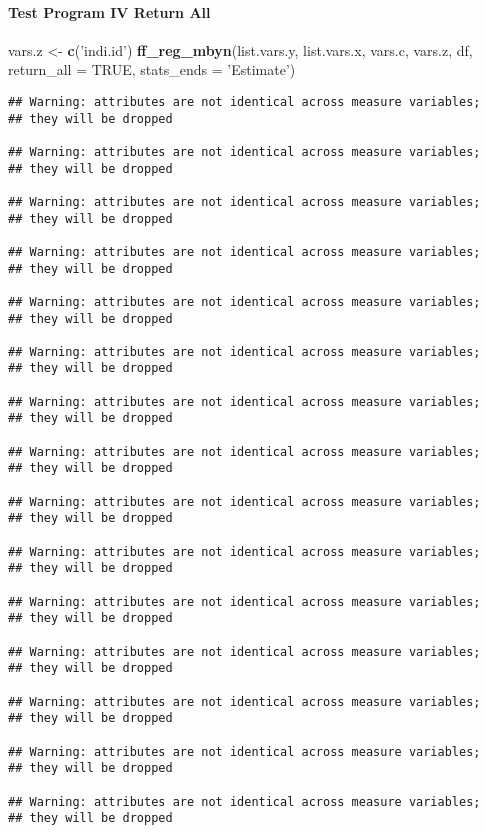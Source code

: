 \documentclass[
]{book}
\newenvironment{Shaded}{\begin{snugshade}}{\end{snugshade}}
\newcommand{\DataTypeTok}[1]{\textcolor[rgb]{0.13,0.29,0.53}{#1}}
\newcommand{\KeywordTok}[1]{\textcolor[rgb]{0.13,0.29,0.53}{\textbf{#1}}}
\newcommand{\NormalTok}[1]{#1}
\newcommand{\OtherTok}[1]{\textcolor[rgb]{0.56,0.35,0.01}{#1}}
\newcommand{\StringTok}[1]{\textcolor[rgb]{0.31,0.60,0.02}{#1}}
\begin{document}
\hypertarget{test-program-iv-return-all}{%
\paragraph{Test Program IV Return All}\label{test-program-iv-return-all}}

\begin{Shaded}
\begin{Highlighting}[]
\NormalTok{vars.z <-}\StringTok{ }\KeywordTok{c}\NormalTok{(}\StringTok{'indi.id'}\NormalTok{)}
\KeywordTok{ff_reg_mbyn}\NormalTok{(list.vars.y, list.vars.x,}
\NormalTok{            vars.c, vars.z, df,}
            \DataTypeTok{return_all =} \OtherTok{TRUE}\NormalTok{,}
            \DataTypeTok{stats_ends =} \StringTok{'Estimate'}\NormalTok{)}
\end{Highlighting}
\end{Shaded}

\begin{verbatim}
## Warning: attributes are not identical across measure variables;
## they will be dropped

## Warning: attributes are not identical across measure variables;
## they will be dropped

## Warning: attributes are not identical across measure variables;
## they will be dropped

## Warning: attributes are not identical across measure variables;
## they will be dropped

## Warning: attributes are not identical across measure variables;
## they will be dropped

## Warning: attributes are not identical across measure variables;
## they will be dropped

## Warning: attributes are not identical across measure variables;
## they will be dropped

## Warning: attributes are not identical across measure variables;
## they will be dropped

## Warning: attributes are not identical across measure variables;
## they will be dropped

## Warning: attributes are not identical across measure variables;
## they will be dropped

## Warning: attributes are not identical across measure variables;
## they will be dropped

## Warning: attributes are not identical across measure variables;
## they will be dropped

## Warning: attributes are not identical across measure variables;
## they will be dropped

## Warning: attributes are not identical across measure variables;
## they will be dropped

## Warning: attributes are not identical across measure variables;
## they will be dropped
\end{verbatim}
\end{document}
